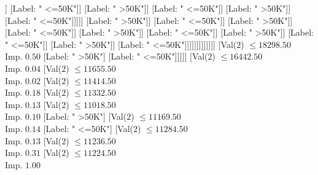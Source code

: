 \documentclass[margin=10pt]{standalone}
\begin{document}
\begin{forest}
																																								[Val($2$) $ \leq 17527.50$ \\ Imp. $0.14$
																																									[Val($2$) $ \leq 17473.50$ \\ Imp. $0.09$
																																										[Val($2$) $ \leq 17464.50$ \\ Imp. $0.20$
																																											[Val($2$) $ \leq 17459.50$ \\ Imp. $0.11$
																																												[Val($2$) $ \leq 17454.50$ \\ Imp. $0.32$
																																													[Label: " <=50K"]
																																													[Label: " >50K"]]
																																												[Label: " <=50K"]]
																																											[Label: " >50K"]]
																																										[Label: " <=50K"]]
																																									[Label: " >50K"]]
																																								[Label: " <=50K"]]]]]
																																				[Label: " >50K"]]
																																			[Label: " <=50K"]]
																																		[Label: " >50K"]]
																																	[Label: " <=50K"]]
																																[Label: " >50K"]]
																															[Label: " <=50K"]]
																														[Label: " >50K"]]
																													[Label: " <=50K"]]
																												[Label: " >50K"]]
																											[Label: " <=50K"]]]]]]]]]]]]]
															[Val($2$) $ \leq 18298.50$ \\ Imp. $0.50$
																[Label: " >50K"]
																[Label: " <=50K"]]]]]
												[Val($2$) $ \leq 16442.50$ \\ Imp. $0.04$
													[Val($2$) $ \leq 11655.50$ \\ Imp. $0.02$
														[Val($2$) $ \leq 11414.50$ \\ Imp. $0.18$
															[Val($2$) $ \leq 11332.50$ \\ Imp. $0.13$
																[Val($2$) $ \leq 11018.50$ \\ Imp. $0.10$
																	[Label: " >50K"]
																	[Val($2$) $ \leq 11169.50$ \\ Imp. $0.14$
																		[Label: " <=50K"]
																		[Val($2$) $ \leq 11284.50$ \\ Imp. $0.13$
																			[Val($2$) $ \leq 11236.50$ \\ Imp. $0.31$
																				[Val($2$) $ \leq 11224.50$ \\ Imp. $1.00$

\end{forest}
\end{document}
